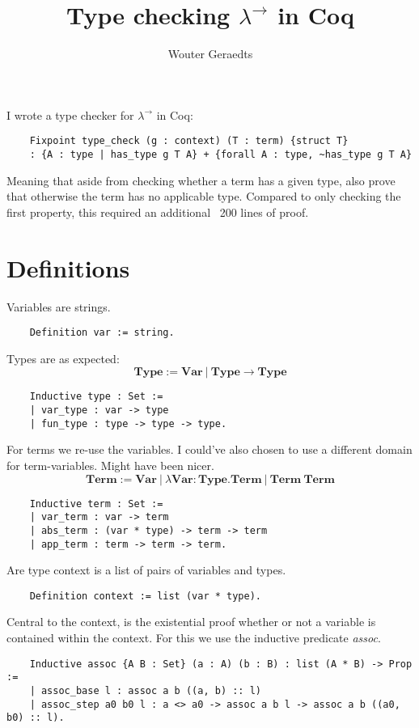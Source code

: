 \documentclass[a4paper, 10pt]{amsart}
\title{Type checking $\lambda^\rightarrow$ in Coq}
\author{Wouter Geraedts}
\begin{document}
	\maketitle

	I wrote a type checker for $\lambda^\rightarrow$ in Coq:

	\begin{lstlisting}
	Fixpoint type_check (g : context) (T : term) {struct T}
	: {A : type | has_type g T A} + {forall A : type, ~has_type g T A}
	\end{lstlisting}

	Meaning that aside from checking whether a term has a given type, also prove that otherwise the term has no applicable type.
	Compared to only checking the first property, this required an additional ~200 lines of proof.

	\section{Definitions}

	Variables are strings.
	\begin{lstlisting}
	Definition var := string.
	\end{lstlisting}

	Types are as expected:
	\[\mathbf{Type} := \mathbf{Var} ~|~ \mathbf{Type} \rightarrow \mathbf{Type}\]
	\begin{lstlisting}
	Inductive type : Set :=
	| var_type : var -> type
	| fun_type : type -> type -> type.
	\end{lstlisting}

	For terms we re-use the variables.
	I could've also chosen to use a different domain for term-variables.
	Might have been nicer.
	\[\mathbf{Term} := \mathbf{Var} ~|~ \lambda \mathbf{Var} : \mathbf{Type} . \mathbf{Term} ~|~ \mathbf{Term}~\mathbf{Term}\]

	\begin{lstlisting}
	Inductive term : Set :=
	| var_term : var -> term
	| abs_term : (var * type) -> term -> term
	| app_term : term -> term -> term.
	\end{lstlisting}

	Are type context is a list of pairs of variables and types.
	\begin{lstlisting}
	Definition context := list (var * type).
	\end{lstlisting}

	Central to the context, is the existential proof whether or not a variable is contained within the context.
	For this we use the inductive predicate \emph{assoc}.
	\begin{lstlisting}
	Inductive assoc {A B : Set} (a : A) (b : B) : list (A * B) -> Prop :=
	| assoc_base l : assoc a b ((a, b) :: l)
	| assoc_step a0 b0 l : a <> a0 -> assoc a b l -> assoc a b ((a0, b0) :: l).
	\end{lstlisting}
\end{document}

